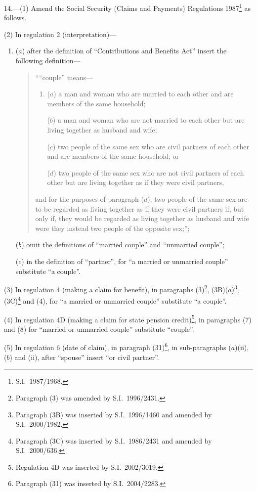 \documentclass[12pt,a4paper]{article}
\begin{document}
14.---(1)  Amend the Social Security (Claims and Payments) Regulations 1987\footnote{S.I.\ 1987/1968.} as follows.

(2) In regulation 2 (interpretation)—
\begin{enumerate}\item[]
($a$) after the definition of “Contributions and Benefits Act” insert the following definition—
\begin{quotation}
““couple” means—
\begin{enumerate}\item[]
($a$) 
a man and woman who are married to each other and are members of the same household;

($b$) 
a man and woman who are not married to each other but are living together as husband and wife;

($c$) 
two people of the same sex who are civil partners of each other and are members of the same household; or

($d$) 
two people of the same sex who are not civil partners of each other but are living together as if they were civil partners,
\end{enumerate}
and for the purposes of paragraph ($d$), two people of the same sex are to be regarded as living together as if they were civil partners if, but only if, they would be regarded as living together as husband and wife were they instead two people of the opposite sex;”;
\end{quotation}

($b$) omit the definitions of “married couple” and “unmarried couple”;

($c$) in the definition of “partner”, for “a married or unmarried couple” substitute “a couple”.
\end{enumerate}

(3) In regulation 4 (making a claim for benefit), in paragraphs (3)\footnote{Paragraph (3) was amended by S.I.\ 1996/2431.}, (3B)($a$)\footnote{Paragraph (3B) was inserted by S.I.\ 1996/1460 and amended by S.I.\ 2000/1982.}, (3C)\footnote{Paragraph (3C) was inserted by S.I.\ 1986/2431 and amended by S.I.\ 2000/636.} and (4), for “a married or unmarried couple” substitute “a couple”.

(4) In regulation 4D (making a claim for state pension credit)\footnote{Regulation 4D was inserted by S.I.\ 2002/3019.}, in paragraphs (7) and (8) for “married or unmarried couple” substitute “couple”.

(5) In regulation 6 (date of claim), in paragraph (31)\footnote{Paragraph (31) was inserted by S.I.\ 2004/2283.}, in sub-paragraphs ($a$)(ii), ($b$)  and (ii), after “spouse” insert “or civil partner”.
\end{document}
